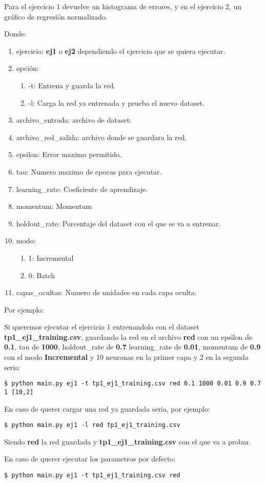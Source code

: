 Para el ejercicio 1 devuelve un histograma de errores, y en el ejercicio 2, un gráfico de regresión normalizado.

Donde:

\begin{enumerate}
\item ejercicio: \textbf{ej1} o \textbf{ej2} dependiendo el ejercicio que se quiera ejecutar.
\item opción: 
\begin{enumerate}
\item -t: Entrena y guarda la red.
\item -l: Carga la red ya entrenada y prueba el nuevo dataset.
\end{enumerate}
\item archivo\_entrada: archivo de dataset.
\item archivo\_red\_salida: archivo donde se guardara la red.
\item epsilon: Error maximo permitido.
\item tau: Numero maximo de epocas para ejecutar.
\item learning\_rate: Coeficiente de aprendizaje.
\item momentum: Momentum
\item holdout\_rate: Porcentaje del dataset con el que se va a entrenar.
\item modo: 
\begin{enumerate}
\item 1: Incremental
\item 0: Batch
\end{enumerate}
\item capas\_ocultas: Numero de unidades en cada capa oculta.
\end{enumerate}

Por ejemplo: 

Si queremos ejecutar el ejercicio 1 entrenandolo con el dataset \textbf{tp1\_ej1\_training.csv}, guardando la red en el archivo 
\textbf{red} con un epsilon de \textbf{0.1}, tau de \textbf{1000}, holdout\_rate de \textbf{0.7} learning\_rate de \textbf{0.01}, momentum de \textbf{0.9} con el modo \textbf{Incremental} y 10 neuronas en la primer capa y 2 en la segunda seria:

\begin{verbatim}
$ python main.py ej1 -t tp1_ej1_training.csv red 0.1 1000 0.01 0.9 0.7 1 [10,2]
\end{verbatim}

En caso de querer cargar una red ya guardada seria, por ejemplo:

\begin{verbatim}
$ python main.py ej1 -l red tp1_ej1_training.csv
\end{verbatim}

Siendo \textbf{red} la red guardada y \textbf{tp1\_ej1\_training.csv} con el que va a probar.



En caso de querer ejecutar los parametros por defecto:

\begin{verbatim}
$ python main.py ej1 -t tp1_ej1_training.csv red 
\end{verbatim}